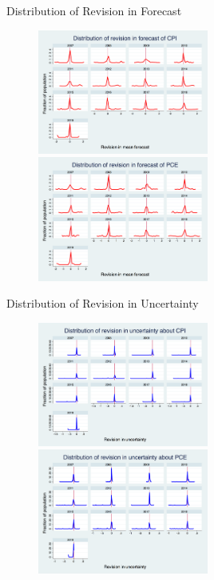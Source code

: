 \documentclass{beamer}
\begin{document}
\begin{frame}{Distribution of Revision in Forecast}
\begin{figure}
	\includegraphics[width=0.5\textwidth]{figuresDraft/PRCCPIMean01_rv_true_hist.png} 
\includegraphics[width=0.5\textwidth]{figuresDraft/PRCPCEMean01_rv_true_hist.png} 
\end{figure}
\end{frame}


\begin{frame}{Distribution of Revision in Uncertainty}
\begin{figure}
	\includegraphics[width=0.5\textwidth]{figuresDraft/PRCCPIVar01_rv_true_hist.png}  
\includegraphics[width=0.5\textwidth]{figuresDraft/PRCPCEVar01_rv_true_hist.png} 
\end{figure}
\end{frame}
\end{document}
